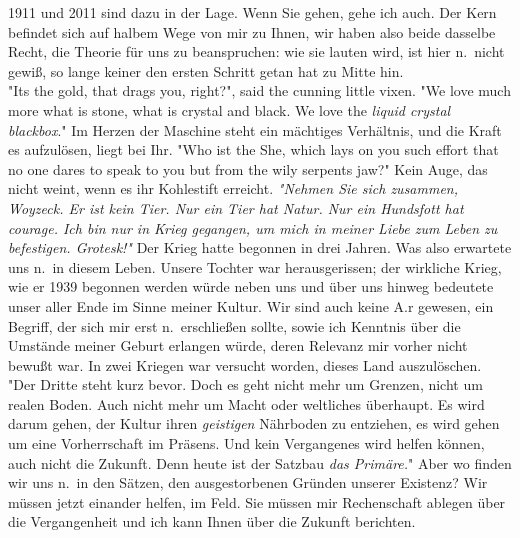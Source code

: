 \documentclass[
]{article}
\begin{document}
1911 und 2011 sind dazu in der Lage. Wenn Sie gehen, gehe ich auch. Der
Kern befindet sich auf halbem Wege von mir zu Ihnen, wir haben also
beide dasselbe Recht, die Theorie für uns zu beanspruchen: wie sie
lauten wird, ist hier n.~nicht gewiß, so lange keiner den ersten Schritt
getan hat zu Mitte hin.\\
"It\textquotesingle s the gold, that drags you, right?", said the
cunning little vixen. "We love much more what is stone, what is crystal
and black. We love the \emph{liquid crystal blackbox}." Im Herzen der
Maschine steht ein mächtiges Verhältnis, und die Kraft es aufzulösen,
liegt bei Ihr. "Who ist the She, which lays on you such effort that no
one dares to speak to you but from the wily serpents jaw?" Kein Auge,
das nicht weint, wenn es ihr Kohlestift erreicht. \emph{"Nehmen Sie sich
zusammen, Woyzeck. Er ist kein Tier. Nur ein Tier hat Natur. Nur ein
Hundsfott hat courage. Ich bin nur in Krieg gegangen, um mich in meiner
Liebe zum Leben zu befestigen. Grotesk!"} Der Krieg hatte begonnen in
drei Jahren. Was also erwartete uns n.~in diesem Leben. Unsere Tochter
war herausgerissen; der wirkliche Krieg, wie er 1939 begonnen werden
würde neben uns und über uns hinweg bedeutete unser aller Ende im Sinne
meiner Kultur. Wir sind auch keine A.r gewesen, ein Begriff, der sich
mir erst n.~erschließen sollte, sowie ich Kenntnis über die Umstände
meiner Geburt erlangen würde, deren Relevanz mir vorher nicht bewußt
war. In zwei Kriegen war versucht worden, dieses Land auszulöschen. "Der
Dritte steht kurz bevor. Doch es geht nicht mehr um Grenzen, nicht um
realen Boden. Auch nicht mehr um Macht oder weltliches überhaupt. Es
wird darum gehen, der Kultur ihren \emph{geistigen }Nährboden zu
entziehen, es wird gehen um eine Vorherrschaft im Präsens. Und kein
Vergangenes wird helfen können, auch nicht die Zukunft. Denn heute ist
der Satzbau \emph{das Primäre.}" Aber wo finden wir uns n.~in den
Sätzen, den ausgestorbenen Gründen unserer Existenz? Wir müssen jetzt
einander helfen, im Feld. Sie müssen mir Rechenschaft ablegen über die
Vergangenheit und ich kann Ihnen über die Zukunft berichten.
\end{document}

